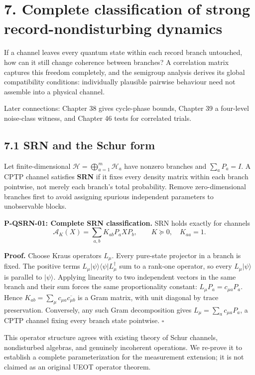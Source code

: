 \documentclass[
  11pt,
  oneside]{book}
\begin{document}
\chapter{7. Complete classification of strong record-nondisturbing
dynamics}\label{ch-7}

If a channel leaves every quantum state within each record branch
untouched, how can it still change coherence between branches? A
correlation matrix captures this freedom completely, and the semigroup
analysis derives its global compatibility conditions: individually
plausible pairwise behaviour need not assemble into a physical channel.

Later connections: Chapter 38 gives cycle-phase bounds, Chapter 39 a
four-level noise-class witness, and Chapter 46 tests for correlated
trials.

\section{7.1 SRN and the Schur form}

Let finite-dimensional \(\mathcal H=\bigoplus_{a=1}^m\mathcal H_a\) have
nonzero branches and \(\sum_aP_a=I\). A CPTP channel satisfies
\textbf{SRN} if it fixes every density matrix within each branch
pointwise, not merely each branch's total probability. Remove
zero-dimensional branches first to avoid assigning spurious independent
parameters to unobservable blocks.

\label{p-qsrn-01}{}

\textbf{P-QSRN-01: Complete SRN classification.} SRN holds exactly for
channels \[
\mathcal A_K(X)=\sum_{a,b}K_{ab}P_aXP_b,\qquad
K\succeq0,\quad K_{aa}=1.
\]

\textbf{Proof.} Choose Kraus operators \(L_\mu\). Every pure-state
projector in a branch is fixed. The positive terms
\(L_\mu|\psi\rangle\langle\psi|L_\mu^\dagger\) sum to a rank-one
operator, so every \(L_\mu|\psi\rangle\) is parallel to
\(|\psi\rangle\). Applying linearity to two independent vectors in the
same branch and their sum forces the same proportionality constant:
\(L_\mu P_a=c_{\mu a}P_a\). Hence
\(K_{ab}=\sum_\mu c_{\mu a}\overline{c_{\mu b}}\) is a Gram matrix, with
unit diagonal by trace preservation. Conversely, any such Gram
decomposition gives \(L_\mu=\sum_ac_{\mu a}P_a\), a CPTP channel fixing
every branch state pointwise. \(\square\)

This operator structure agrees with existing theory of Schur channels,
nondisturbed algebras, and genuinely incoherent operations. We re-prove
it to establish a complete parameterization for the measurement
extension; it is not claimed as an original UEOT operator theorem.
\end{document}
